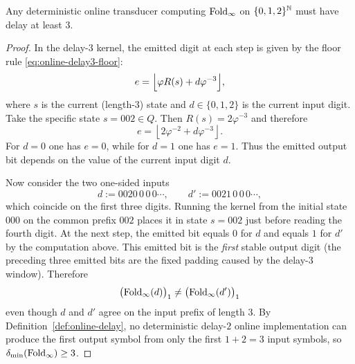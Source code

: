 \begin{proposition}\label{prop:online-delay-min-3}
Any deterministic online transducer computing $\mathrm{Fold}_\infty$ on $\{0,1,2\}^{\mathbb{N}}$ must have delay at least $3$.
\end{proposition}
\begin{proof}
In the delay-$3$ kernel, the emitted digit at each step is given by the floor rule \eqref{eq:online-delay3-floor}:
\[
e=\Bigl\lfloor \varphi R(s)+d\varphi^{-3}\Bigr\rfloor,
\]
where $s$ is the current (length-$3$) state and $d\in\{0,1,2\}$ is the current input digit.
Take the specific state $s=002\in Q$.
Then $R(s)=2\varphi^{-3}$ and therefore
\[
e=\left\lfloor 2\varphi^{-2}+d\varphi^{-3}\right\rfloor.
\]
For $d=0$ one has $e=0$, while for $d=1$ one has $e=1$.
Thus the emitted output bit depends on the value of the current input digit $d$.
\par
Now consider the two one-sided inputs
\[
d:=0020\,0\,0\,0\cdots,\qquad d':=0021\,0\,0\,0\cdots,
\]
which coincide on the first three digits.
Running the kernel from the initial state $000$ on the common prefix $002$ places it in state $s=002$ just before reading the fourth digit.
At the next step, the emitted bit equals $0$ for $d$ and equals $1$ for $d'$ by the computation above.
This emitted bit is the \emph{first} stable output digit (the preceding three emitted bits are the fixed padding caused by the delay-$3$ window).
Therefore
\[
\bigl(\mathrm{Fold}_\infty(d)\bigr)_1\neq \bigl(\mathrm{Fold}_\infty(d')\bigr)_1
\]
even though $d$ and $d'$ agree on the input prefix of length $3$.
By Definition~\ref{def:online-delay}, no deterministic delay-$2$ online implementation can produce the first output symbol from only the first $1+2=3$ input symbols, so $\delta_{\min}(\mathrm{Fold}_\infty)\ge 3$.
\end{proof}

